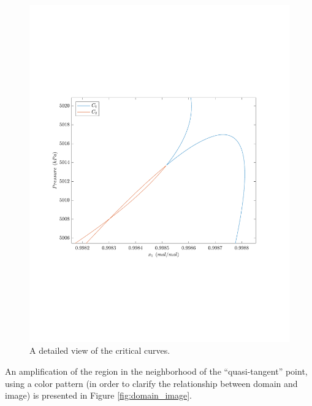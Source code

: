 \documentclass{article}
\theoremstyle{definition}
\theoremstyle{remark}
\begin{document}
\begin{figure}
	\begin{center}
		\includegraphics[scale=0.50]{curvas_criticas_dominio.pdf}
		\caption{A detailed view of the critical curves.}\label{fig:sinais}
	\end{center}
\end{figure}
 
An amplification of the region in the neighborhood of the ``quasi-tangent'' point, using a color pattern (in order to clarify the relationship between domain and image) is presented in Figure \ref{fig:domain_image}.
\end{document}
